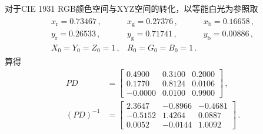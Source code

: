 对于CIE 1931 RGB颜色空间与XYZ空间的转化，以等能白光为参照取
\begin{align}
      \begin{array}{lll}
            x_\mathrm{r}=0.73467\, , & x_\mathrm{g}=0.27376\, , & x_\mathrm{b}=0.16658\, , \\
            y_\mathrm{r}=0.26533\, , & y_\mathrm{g}=0.71741\, , & y_\mathrm{b}=0.00886\, , \\
            X_0=Y_0=Z_0=1\, ,        & R_0=G_0=B_0=1\, .        &
      \end{array}
\end{align}
算得
\begin{align}
      PD        & =\left[\begin{array}{rrr}
                  0.4900  & 0.3100 & 0.2000 \\
                  0.1770  & 0.8124 & 0.0106 \\
                  -0.0000 & 0.0100 & 0.9900
            \end{array}\right]\, , \\
      (PD)^{-1} & =\left[\begin{array}{rrr}
                  2.3647  & -0.8966 & -0.4681 \\
                  -0.5152 & 1.4264  & 0.0887  \\
                  0.0052  & -0.0144 & 1.0092
            \end{array}\right]\, .
\end{align}

